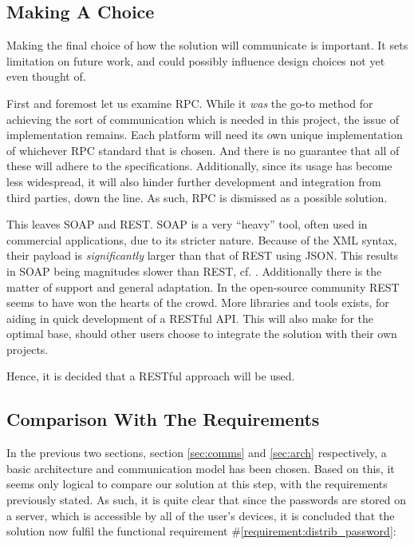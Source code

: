 		\subsection{Making A Choice}
			Making the final choice of how the solution will communicate is important. It sets limitation on future work, and could possibly influence design choices not yet even thought of. 

			First and foremost let us examine RPC. While it \emph{was} the go-to method for achieving the sort of communication which is needed in this project, the issue of implementation remains. Each platform will need its own unique implementation of whichever RPC standard that is chosen. And there is no guarantee that all of these will adhere to the specifications. Additionally, since its usage has become less widespread, it will also hinder further development and integration from third parties, down the line. As such, RPC is dismissed as a possible solution.

			This leaves SOAP and REST. SOAP is a very ``heavy'' tool, often used in commercial applications, due to its stricter nature. Because of the XML syntax, their payload is \emph{significantly} larger than that of REST using JSON. This results in SOAP being magnitudes slower than REST, cf. \cite{soap_vs_rest}. Additionally there is the matter of support and general adaptation. In the open-source community REST seems to have won the hearts of the crowd. More libraries and tools exists, for aiding in quick development of a RESTful API. This will also make for the optimal base, should other users choose to integrate the solution with their own projects.

			Hence, it is decided that a RESTful approach will be used. 

		\subsection{Comparison With The Requirements}
			\label{requirement:fulfilled:distrib_password}
			In the previous two sections, section \ref{sec:comms} and \ref{sec:arch} respectively, a basic architecture and communication model has been chosen. Based on this, it seems only logical to compare our solution at this step, with the requirements previously stated. As such, it is quite clear that since the passwords are stored on a server, which is accessible by all of the user's devices, it is concluded that the solution now fulfil the functional requirement \#\ref{requirement:distrib_password}:


